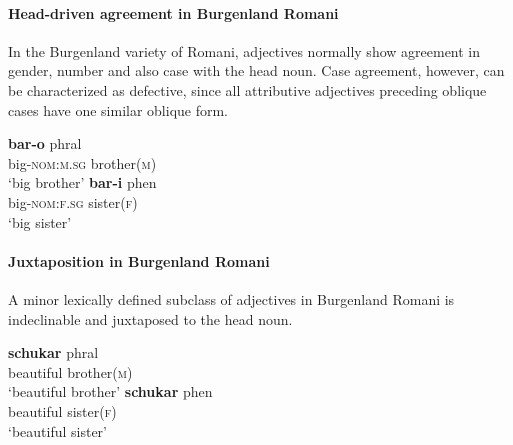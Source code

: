 \paragraph*{Head\hyp{}driven agreement in Burgenland Romani}
\label{romani synchr}
In the Burgenland variety of Romani, adjectives normally show agreement in gender, number and also case with the head noun. Case agreement, however, can be characterized as defective, since all attributive adjectives preceding oblique cases have one similar oblique form.
\begin{exe}
\begin{xlist} 
\ex 
\gll	\textbf{bar-o} phral\\
	big-\textsc{nom:m.sg} brother(\textsc{m})\\
\glt	‘big brother’
\ex
\gll	\textbf{bar-i} phen\\
	big-\textsc{nom:f.sg} sister(\textsc{f})\\
\glt	‘big sister’
\end{xlist}
\end{exe}

\paragraph*{Juxtaposition in Burgenland Romani}
A minor lexically defined subclass of adjectives in Burgenland Romani is indeclinable and juxtaposed to the head noun.
\begin{exe}
\begin{xlist}
\ex 
\gll	\textbf{schukar} phral\\
	beautiful brother(\textsc{m})\\
\glt	‘beautiful brother’
\ex
\gll	\textbf{schukar} phen\\
	beautiful sister(\textsc{f})\\
\glt	‘beautiful sister’
\end{xlist}
\end{exe}

